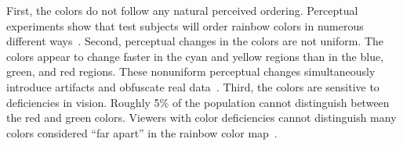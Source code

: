 \documentclass{llncs}
\begin{document}
{}{

  First, the colors do not follow any natural
  perceived ordering.  Perceptual experiments show that test subjects will
  order rainbow colors in numerous different ways~\cite{Ware04}.  Second,
  perceptual changes in the colors are not uniform.  The colors appear to
  change faster in the cyan and yellow regions than in the blue, green, and
  red regions.  These nonuniform perceptual changes simultaneously
  introduce artifacts and obfuscate real data~\cite{Borland07}.  Third, the
  colors are sensitive to deficiencies in vision.  Roughly 5\% of the
  population cannot distinguish between the red and green colors.  Viewers
  with color deficiencies cannot distinguish many colors considered ``far
  apart'' in the rainbow color map~\cite{Light04}.

}
\end{document}
